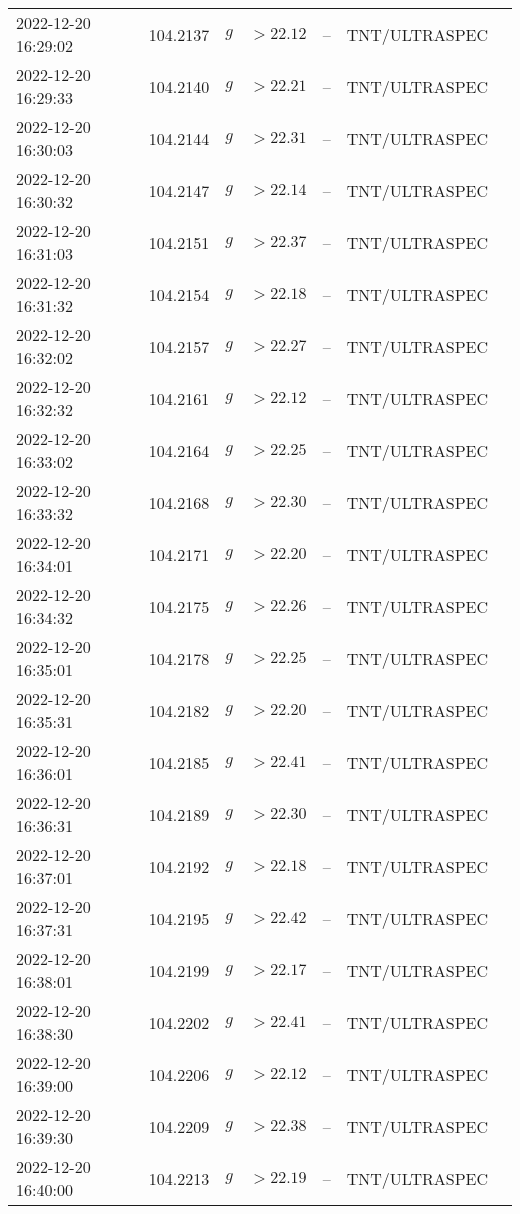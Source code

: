 \documentclass{nature_plusfigure}
\begin{document}
\begin{supplement}
\begin{center}
\begin{longtable}{lllllll}
2022-12-20 16:29:02 & 104.2137 & $g$ & $>22.12$ & -- & TNT/ULTRASPEC &  \\ 
2022-12-20 16:29:33 & 104.2140 & $g$ & $>22.21$ & -- & TNT/ULTRASPEC &  \\ 
2022-12-20 16:30:03 & 104.2144 & $g$ & $>22.31$ & -- & TNT/ULTRASPEC &  \\ 
2022-12-20 16:30:32 & 104.2147 & $g$ & $>22.14$ & -- & TNT/ULTRASPEC &  \\ 
2022-12-20 16:31:03 & 104.2151 & $g$ & $>22.37$ & -- & TNT/ULTRASPEC &  \\ 
2022-12-20 16:31:32 & 104.2154 & $g$ & $>22.18$ & -- & TNT/ULTRASPEC &  \\ 
2022-12-20 16:32:02 & 104.2157 & $g$ & $>22.27$ & -- & TNT/ULTRASPEC &  \\ 
2022-12-20 16:32:32 & 104.2161 & $g$ & $>22.12$ & -- & TNT/ULTRASPEC &  \\ 
2022-12-20 16:33:02 & 104.2164 & $g$ & $>22.25$ & -- & TNT/ULTRASPEC &  \\ 
2022-12-20 16:33:32 & 104.2168 & $g$ & $>22.30$ & -- & TNT/ULTRASPEC &  \\ 
2022-12-20 16:34:01 & 104.2171 & $g$ & $>22.20$ & -- & TNT/ULTRASPEC &  \\ 
2022-12-20 16:34:32 & 104.2175 & $g$ & $>22.26$ & -- & TNT/ULTRASPEC &  \\ 
2022-12-20 16:35:01 & 104.2178 & $g$ & $>22.25$ & -- & TNT/ULTRASPEC &  \\ 
2022-12-20 16:35:31 & 104.2182 & $g$ & $>22.20$ & -- & TNT/ULTRASPEC &  \\ 
2022-12-20 16:36:01 & 104.2185 & $g$ & $>22.41$ & -- & TNT/ULTRASPEC &  \\ 
2022-12-20 16:36:31 & 104.2189 & $g$ & $>22.30$ & -- & TNT/ULTRASPEC &  \\ 
2022-12-20 16:37:01 & 104.2192 & $g$ & $>22.18$ & -- & TNT/ULTRASPEC &  \\ 
2022-12-20 16:37:31 & 104.2195 & $g$ & $>22.42$ & -- & TNT/ULTRASPEC &  \\ 
2022-12-20 16:38:01 & 104.2199 & $g$ & $>22.17$ & -- & TNT/ULTRASPEC &  \\ 
2022-12-20 16:38:30 & 104.2202 & $g$ & $>22.41$ & -- & TNT/ULTRASPEC &  \\ 
2022-12-20 16:39:00 & 104.2206 & $g$ & $>22.12$ & -- & TNT/ULTRASPEC &  \\ 
2022-12-20 16:39:30 & 104.2209 & $g$ & $>22.38$ & -- & TNT/ULTRASPEC &  \\ 
2022-12-20 16:40:00 & 104.2213 & $g$ & $>22.19$ & -- & TNT/ULTRASPEC &  \\ 

\end{longtable}
\end{center}
\end{supplement}
\end{document}
